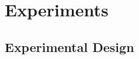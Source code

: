 \documentclass{article} %
\begin{document}

\section{Experiments}
\label{sec: experiments}
\subsection{Experimental Design}
\end{document}
